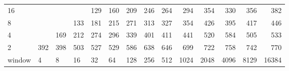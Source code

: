 \begin{table}[h]
\begin{tabular}{lrrrrrrrrrrrrr}
		\multicolumn{1}{|l|}{16} &  &  &  & \cellcolor[HTML]{99E600}129 & \cellcolor[HTML]{99E600}160 & \cellcolor[HTML]{99E600}209 & \cellcolor[HTML]{E69900}246 & \cellcolor[HTML]{E69900}264 & \cellcolor[HTML]{E69900}294 & \cellcolor[HTML]{E60000}354 & \cellcolor[HTML]{E69900}330 & \cellcolor[HTML]{E60000}356 & \cellcolor[HTML]{E60000}382 \\ \cline{1-1}
		\multicolumn{1}{|l|}{8} &  &  & \cellcolor[HTML]{99E600}133 & \cellcolor[HTML]{99E600}181 & \cellcolor[HTML]{99E600}215 & \cellcolor[HTML]{E69900}271 & \cellcolor[HTML]{E69900}313 & \cellcolor[HTML]{E69900}327 & \cellcolor[HTML]{E60000}354 & \cellcolor[HTML]{E60000}426 & \cellcolor[HTML]{E60000}395 & \cellcolor[HTML]{E60000}417 & \cellcolor[HTML]{E60000}446 \\ \cline{1-1}
		\multicolumn{1}{|l|}{4} &  & \cellcolor[HTML]{99E600}169 & \cellcolor[HTML]{99E600}212 & \cellcolor[HTML]{E69900}274 & \cellcolor[HTML]{E69900}296 & \cellcolor[HTML]{E69900}339 & \cellcolor[HTML]{E60000}401 & \cellcolor[HTML]{E60000}411 & \cellcolor[HTML]{E60000}441 & \cellcolor[HTML]{9900E6}520 & \cellcolor[HTML]{9900E6}584 & \cellcolor[HTML]{9900E6}505 & \cellcolor[HTML]{9900E6}533 \\ \cline{1-1}
		\multicolumn{1}{|l|}{2} & \cellcolor[HTML]{E60000}392 & \cellcolor[HTML]{E60000}398 & \cellcolor[HTML]{9900E6}503 & \cellcolor[HTML]{9900E6}527 & \cellcolor[HTML]{9900E6}529 & \cellcolor[HTML]{9900E6}586 & \cellcolor[HTML]{9900E6}638 & \cellcolor[HTML]{4C00E6}646 & \cellcolor[HTML]{4C00E6}699 & \cellcolor[HTML]{4C00E6}722 & \cellcolor[HTML]{4C00E6}758 & \cellcolor[HTML]{4C00E6}742 & \cellcolor[HTML]{4C00E6}770 \\ \hline
		\multicolumn{1}{l|}{window} & \multicolumn{1}{l|}{4} & \multicolumn{1}{l|}{8} & \multicolumn{1}{l|}{16} & \multicolumn{1}{l|}{32} & \multicolumn{1}{l|}{64} & \multicolumn{1}{l|}{128} & \multicolumn{1}{l|}{256} & \multicolumn{1}{l|}{512} & \multicolumn{1}{l|}{1024} & \multicolumn{1}{l|}{2048} & \multicolumn{1}{l|}{4096} & \multicolumn{1}{l|}{8129} & \multicolumn{1}{l|}{16384} \\ \cline{2-14} 
	\end{tabular}
\end{table}